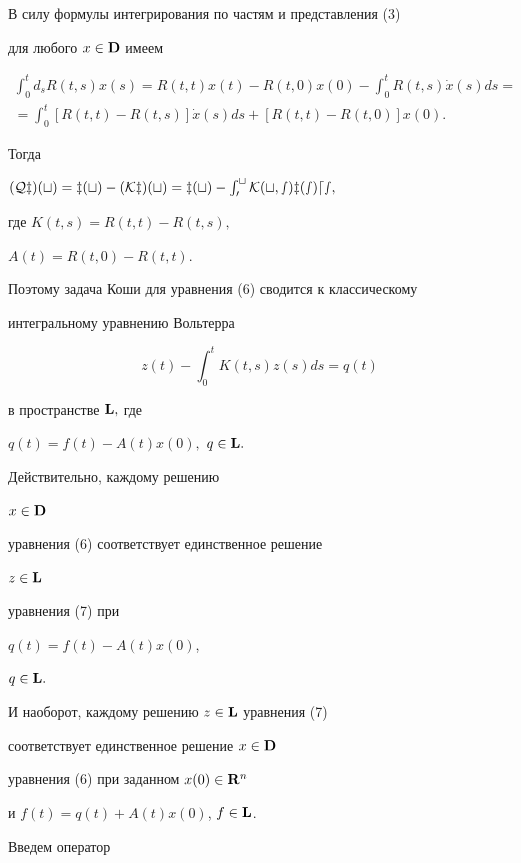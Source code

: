 В силу формулы интегрирования по частям и представления (3)


для любого $x\in{\bold D}$ имеем


\begin{multline*}


\int_0^t d_sR(t,s)x(s) = R(t,t)x(t) - R(t,0)x(0) -


\int_0^t R(t,s)\dot{x}(s)ds=\\


= \int_0^t[R(t,t) -R(t,s)]\Dot x (s)ds + [R(t,t) - R(t,0)] x(0).


\end{multline*}


Тогда


$(\cal Q z)(t)=z(t)-(\cal K z)(t)=z(t)-\int_0^tK(t,s)z(s)ds,$


где $K(t,s)=R(t,t) - R(t,s),$


$A(t) = R(t,0)-R(t,t).$





Поэтому задача Коши для уравнения (6) сводится к классическому


интегральному уравнению Вольтерра


\begin{equation}


z(t) - \int_0^tK(t,s) z(s)ds = q(t)


\end{equation}


в пространстве $\bold L,$ где


$q(t) = f(t) - A(t) x(0),$ $q\in\bold L.$


Действительно, каждому решению


$x\in\bold D$


уравнения (6) соответствует единственное решение


$z\in\bold L$


уравнения (7) при


$q(t)=f(t)-A(t)x(0)$,


$q\in\bold L.$


И наоборот, каждому решению $z\in\bold L$ уравнения (7)


соответствует единственное решение $x\in\bold D$


уравнения (6) при заданном $x(0)\in\bold R^n$


и $f(t)=q(t)+A(t)x(0)$, $f\in\bold L$.





Введем оператор


